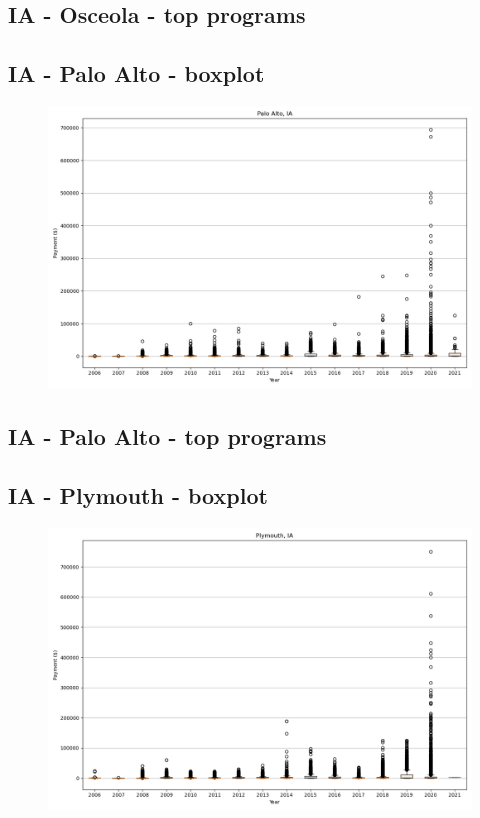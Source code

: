 \subsection*{IA - Osceola - top programs}

\newpage
\subsection*{IA - Palo Alto - boxplot}
\begin{figure}[h]
\centering
\includegraphics[width=7in]{../output/boxplots/counties/Palo Alto-IA_boxplot.png}
\end{figure}


\subsection*{IA - Palo Alto - top programs}

\newpage
\subsection*{IA - Plymouth - boxplot}
\begin{figure}[h]
\centering
\includegraphics[width=7in]{../output/boxplots/counties/Plymouth-IA_boxplot.png}
\end{figure}


